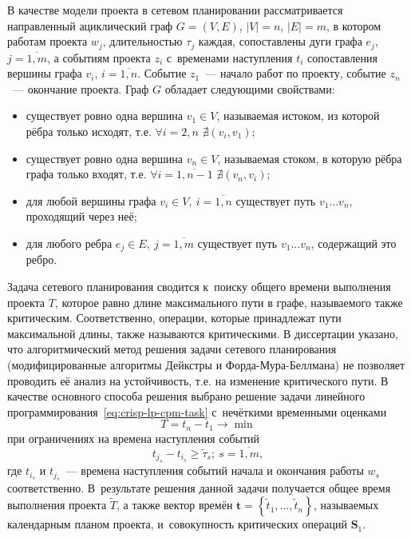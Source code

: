 В качестве модели проекта в сетевом планировании рассматривается направленный ациклический граф $G=(V,E)$, $\left| V \right|=n$, $\left| E \right|=m$, в котором работам проекта $w_j$, длительностью $\tau_j$ каждая, сопоставлены дуги графа $e_j$, $j=\overline{1,m}$, а событиям проекта $z_i$ с~временами наступления $t_i$ сопоставления вершины графа $v_i$, $i=\overline{1,n}$. Событие $z_1$~--- начало работ по проекту, событие $z_n$~--- окончание проекта. Граф $G$ обладает следующими свойствами:
\begin{itemize}
  \item существует ровно одна вершина $v_1\in V$, называемая истоком, из которой рёбра только исходят, т.е. $\forall i=2,n$ $\nexists \left( v_i, v_1 \right)$;
  \item существует ровно одна вершина $v_n\in V$, называемая стоком, в которую рёбра графа только входят, т.е.  $\forall i=\overline{1,n-1}$ $\nexists \left( v_n, v_i \right)$;
  \item для любой вершины графа $v_i\in V,\ i=\overline{1,n}$ существует путь $v_1\ldots v_n$, проходящий через неё;
  \item для любого ребра $e_j\in E,\ j=\overline{1,m}$ существует путь $v_1\ldots v_n$, содержащий это ребро.
\end{itemize}

Задача сетевого планирования сводится к~поиску общего времени выполнения проекта $T$, которое равно длине максимального пути в графе, называемого также критическим. Соответственно, операции, которые принадлежат пути максимальной длины, также называются критическими. В диссертации указано, что алгоритмический метод решения задачи сетевого планирования (модифицированные алгоритмы Дейкстры и Форда-Мура-Беллмана) не позволяет проводить её анализ на устойчивость, т.е. на изменение критического пути. В качестве основного способа решения выбрано решение задачи линейного программирования~\eqref{eq:crisp-lp-cpm-task} с~нечёткими временными оценками
\begin{equation}
\label{eq:crisp-lp-cpm-task}
  T=t_n-t_1 \to \min
\end{equation}
при ограничениях на времена наступления событий
\begin{equation}
\label{eq:crisp-lp-cpm-restrictions}
  t_{j_s}-t_{i_s}\geqslant \tilde \tau_s;\ s=\overline{1,m},
\end{equation}
где $t_{i_s}$ и $t_{j_s}$~--- времена наступления событий начала и окончания работы $w_s$ соответственно. В~результате решения данной задачи получается общее время выполнения проекта $\tilde T$, а также вектор времён $\mathbf{t}=\left\{\tilde t_1, \ldots, \tilde t_n \right\}$, называемых календарным планом проекта, и~совокупность критических операций $\mathbf{S}_1$.

